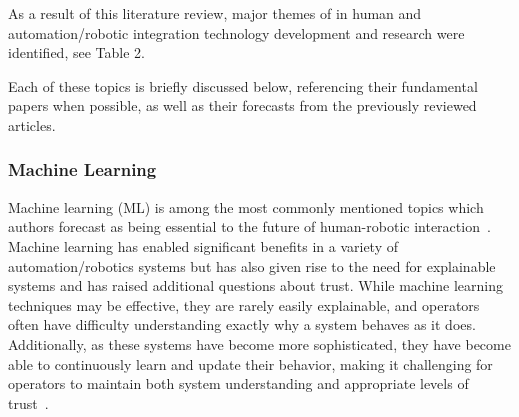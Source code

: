As a result of this literature review, major themes of in human and automation/robotic integration technology development and research were identified, see Table 2.


Each of these topics is briefly discussed below, referencing their fundamental papers when possible, as well as their forecasts from the previously reviewed articles.

\subsubsection{Machine Learning}
Machine learning (ML) is among the most commonly mentioned topics which authors forecast as being essential to the future of human-robotic interaction~\citep{wang_current_2018}.
Machine learning has enabled significant benefits in a variety of automation/robotics systems but has also given rise to the need for explainable systems and has raised additional questions about trust.
While machine learning techniques may be effective, they are rarely easily explainable, and operators often have difficulty understanding exactly why a system behaves as it does.
Additionally, as these systems have become more sophisticated, they have become able to continuously learn and update their behavior, making it challenging for operators to maintain both system understanding and appropriate levels of trust~\citep{chen_humanagent_2014}.

